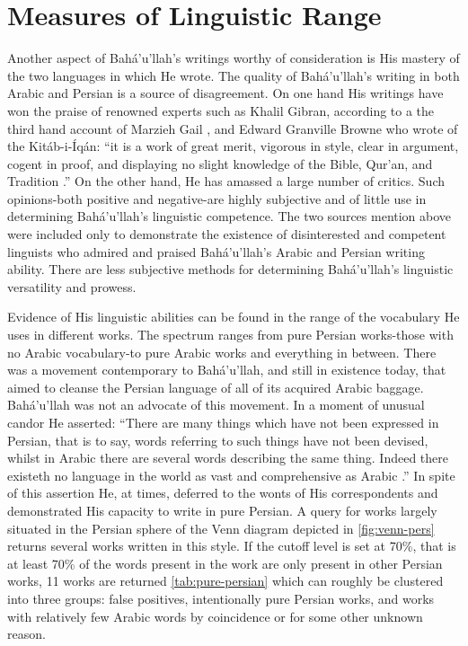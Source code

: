\documentclass[12pt, oneside]{report}
\begin{document}
\section{Measures of Linguistic Range}
\par
Another aspect of Bah\'{a}'u'llah's writings worthy of consideration is His mastery of the two languages in which He wrote.
The quality of Bah\'{a}'u'llah's writing in both Arabic and Persian is a source of disagreement.
On one hand His writings have won the praise of renowned experts such as Khalil Gibran, according to a the third hand account of Marzieh Gail \cite{gail_world_1978}, and Edward Granville Browne who wrote of the Kit\'{a}b-i-\'{I}q\'{a}n: ``it is a work of great merit, vigorous in style, clear in argument, cogent in proof, and displaying no slight knowledge of the Bible, Qur'an, and Tradition \cite{momen_selections_1987}.''
On the other hand, He has amassed a large number of critics.
Such opinions-both positive and negative-are highly subjective and of little use in determining Bah\'{a}'u'llah's linguistic competence.
The two sources mention above were included only to demonstrate the existence of disinterested and competent linguists who admired and praised Bah\'{a}'u'llah's Arabic and Persian writing ability.
There are less subjective methods for determining Bah\'{a}'u'llah's linguistic versatility and prowess.
\par
Evidence of His linguistic abilities can be found in the range of the vocabulary He uses in different works.
The spectrum ranges from pure Persian works-those with no Arabic vocabulary-to pure Arabic works and everything in between.
There was a movement contemporary to Bah\'{a}'u'llah, and still in existence today, that aimed to cleanse the Persian language of all of its acquired Arabic baggage.
Bah\'{a}'u'llah was not an advocate of this movement.
In a moment of unusual candor He asserted: ``There are many things which have not been expressed in Persian, that is to say, words referring to such things have not been devised, whilst in Arabic there are several words describing the same thing. Indeed there existeth no language in the world as vast and comprehensive as Arabic \cite{bahaullah_tabernacle_2006}.''
In spite of this assertion He, at times, deferred to the wonts of His correspondents and demonstrated His capacity to write in pure Persian.
A query for works largely situated in the Persian sphere of the Venn diagram depicted in \autoref{fig:venn-pers} returns several works written in this style.
If the cutoff level is set at 70\%, that is at least 70\% of the words present in the work are only present in other Persian works, 11 works are returned \ref{tab:pure-persian} which can roughly be clustered into three groups: false positives, intentionally pure Persian works, and works with relatively few Arabic words by coincidence or for some other unknown reason.
\end{document}

